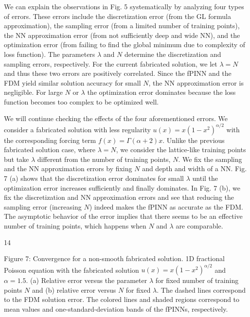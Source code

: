 \documentclass[UTF8]{article}
\begin{document}
We can explain the observations in Fig. 5 systematically by analyzing four types of errors. These errors include the discretization error (from the GL formula approximation), the sampling error (from a limited number of training points), the NN approximation error (from not sufficiently deep and wide NN), and the optimization error (from failing to find the global minimum due to complexity of loss function). The parameters $\lambda$ and $N$ determine the discretization and sampling errors, respectively. For the current fabricated solution, we let $\lambda = N$ and thus these two errors are positively correlated. Since the fPINN and the FDM yield similar solution accuracy for small $N$, the NN approximation error is negligible. For large $N$ or $\lambda$ the optimization error dominates because the loss function becomes too complex to be optimized well.

We will continue checking the effects of the four aforementioned errors. We consider a fabricated solution with less regularity $u(x) = x(1-x^2)^{\alpha/2}$ with the corresponding forcing term $f(x) = \Gamma(\alpha+2)x$. Unlike the previous fabricated solution case, where $\lambda = N$, we consider the lattice-like training points but take $\lambda$ different from the number of training points, $N$. We fix the sampling and the NN approximation errors by fixing $N$ and depth and width of a NN. Fig. 7 (a) shows that the discretization error dominates for small $\lambda$ until the optimization error increases sufficiently and finally dominates. In Fig. 7 (b), we fix the discretization and NN approximation errors and see that reducing the sampling error (increasing $N$) indeed makes the fPINN as accurate as the FDM. The asymptotic behavior of the error implies that there seems to be an effective number of training points, which happens when $N$ and $\lambda$ are comparable.

\vspace{1cm}
\centerline{14}

Figure 7: Convergence for a non-smooth fabricated solution. 1D fractional Poisson equation with the fabricated solution $u(x) = x(1-x^2)^{\alpha/2}$ and $\alpha = 1.5$. (a) Relative error versus the parameter $\lambda$ for fixed number of training points $N$ and (b) relative error versus $N$ for fixed $\lambda$. The dashed lines correspond to the FDM solution error. The colored lines and shaded regions correspond to mean values and one-standard-deviation bands of the fPINNs, respectively.
\end{document}
